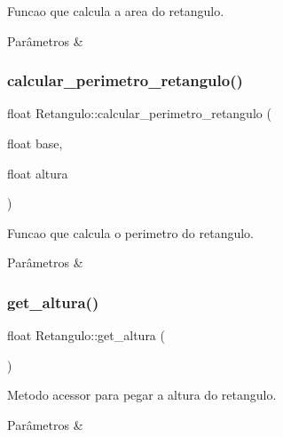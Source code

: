 Funcao que calcula a area do retangulo. 


\begin{DoxyParams}{Parâmetros}
{\em } & \\
\hline
\end{DoxyParams}
\mbox{\label{classRetangulo_a5492c2c28752d73ea1be6344a9cc1cd6}} 
\subsubsection{\texorpdfstring{calcular\+\_\+perimetro\+\_\+retangulo()}{calcular\_perimetro\_retangulo()}}
{\footnotesize\ttfamily float Retangulo\+::calcular\+\_\+perimetro\+\_\+retangulo (\begin{DoxyParamCaption}\item[{float}]{base,  }\item[{float}]{altura }\end{DoxyParamCaption})}



Funcao que calcula o perimetro do retangulo. 


\begin{DoxyParams}{Parâmetros}
{\em } & \\
\hline
\end{DoxyParams}
\mbox{\label{classRetangulo_a1ae47fd4586b8830eefda98ea5052442}} 
\subsubsection{\texorpdfstring{get\+\_\+altura()}{get\_altura()}}
{\footnotesize\ttfamily float Retangulo\+::get\+\_\+altura (\begin{DoxyParamCaption}{ }\end{DoxyParamCaption})}



Metodo acessor para pegar a altura do retangulo. 


\begin{DoxyParams}{Parâmetros}
{\em } & \\
\hline
\end{DoxyParams}
\mbox{\label{classRetangulo_a88b27fde6571b4e7c78c4bdf100075c5}} 
